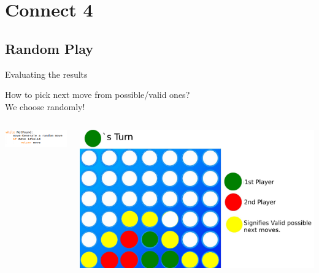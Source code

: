 \documentclass[aspectratio=169]{beamer}
\begin{document}
\section{Connect 4}

\subsection{Random Play}
\begin{frame}{Evaluating the results}

How to pick next move from possible/valid ones? \\
We choose randomly! 
\begin{columns}
	 	\begin{column}{0.5\textwidth}
			\centering
			\includegraphics[scale = .75]{random_algo.png}
	 	\end{column}
 		\begin{column}{0.5\textwidth}
			\centering
			\includegraphics[scale = 0.1]{valid.jpeg}	
	 	\end{column}
	 \end{columns}
\end{frame}
\end{document}
